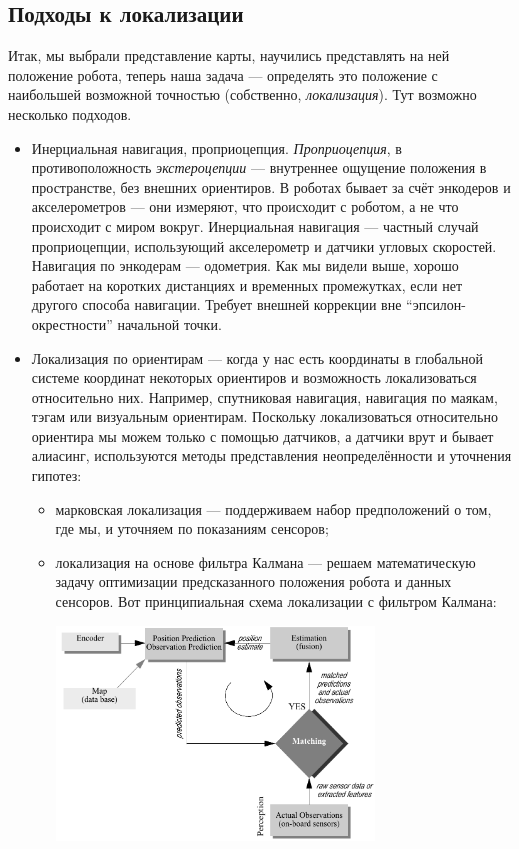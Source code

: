 \documentclass{../../text-style}
\begin{document}
\subsection{Подходы к локализации}

Итак, мы выбрали представление карты, научились представлять на ней положение робота, теперь наша задача --- определять это положение с наибольшей возможной точностью (собственно, \emph{локализация}).
Тут возможно несколько подходов.

\begin{itemize}
    \item Инерциальная навигация, проприоцепция.
        \emph{Проприоцепция}, в противоположность \emph{экстероцепции} --- внутреннее ощущение положения в пространстве, без внешних ориентиров.
        В роботах бывает за счёт энкодеров и акселерометров --- они измеряют, что происходит с роботом, а не что происходит с миром вокруг.
        Инерциальная навигация --- частный случай проприоцепции, использующий акселерометр и датчики угловых скоростей.
        Навигация по энкодерам --- одометрия.
        Как мы видели выше, хорошо работает на коротких дистанциях и временных промежутках, если нет другого способа навигации.
        Требует внешней коррекции вне \enquote{эпсилон-окрестности} начальной точки.
    \item Локализация по ориентирам --- когда у нас есть координаты в глобальной системе координат некоторых ориентиров и возможность локализоваться относительно них.
        Например, спутниковая навигация, навигация по маякам, тэгам или визуальным ориентирам.
        Поскольку локализоваться относительно ориентира мы можем только с помощью датчиков, а датчики врут и бывает алиасинг, используются методы представления неопределённости и уточнения гипотез:
    \begin{itemize}
        \item марковская локализация --- поддерживаем набор предположений о том, где мы, и уточняем по показаниям сенсоров;
        \item локализация на основе фильтра Калмана --- решаем математическую задачу оптимизации предсказанного положения робота и данных сенсоров.
            Вот принципиальная схема локализации с фильтром Калмана:
            \begin{center}
                \includegraphics[width=0.7\textwidth]{kalmanLocalization.png}

\end{center}
\end{itemize}
\end{itemize}
\end{document}
